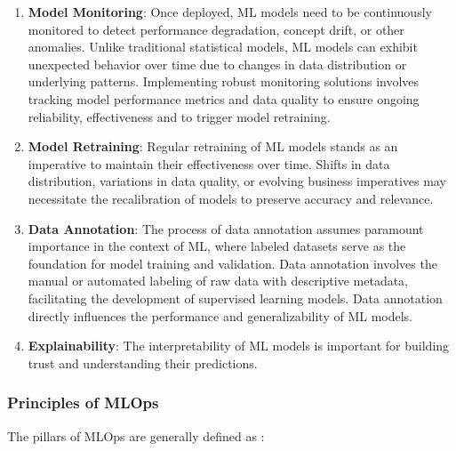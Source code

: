 \begin{enumerate}
    \item \textbf{Model Monitoring}: Once deployed, ML models need to be continuously monitored to detect performance degradation, concept drift, or other anomalies. Unlike traditional statistical models, ML models can exhibit unexpected behavior over time due to changes in data distribution or underlying patterns. Implementing robust monitoring solutions involves tracking model performance metrics and data quality to ensure ongoing reliability, effectiveness and to trigger model retraining.

    \item \textbf{Model Retraining}: Regular retraining of ML models stands as an imperative to maintain their effectiveness over time. Shifts in data distribution, variations in data quality, or evolving business imperatives may necessitate the recalibration of models to preserve accuracy and relevance. 

    \item \textbf{Data Annotation}: The process of data annotation assumes paramount importance in the context of ML, where labeled datasets serve as the foundation for model training and validation. Data annotation involves the manual or automated labeling of raw data with descriptive metadata, facilitating the development of supervised learning models. Data annotation directly influences the performance and generalizability of ML models.

    \item \textbf{Explainability}: The interpretability of ML models is important for building trust and understanding their predictions.
\end{enumerate}

\subsubsection{Principles of MLOps}

The pillars of MLOps\cite{kreuzberger2023machine} are generally defined as :

